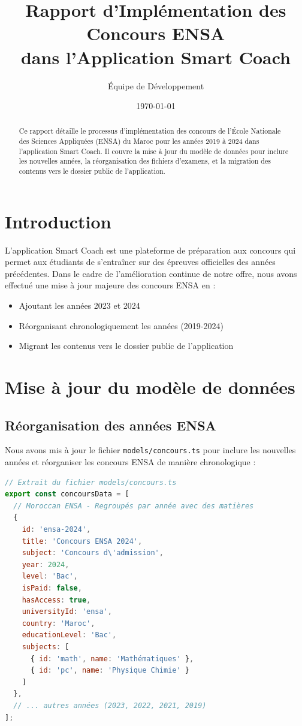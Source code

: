 \documentclass[12pt,a4paper]{article}
\title{\vspace{-1.5cm}\textbf{Rapport d'Implémentation des Concours ENSA\\dans l'Application Smart Coach}}
\author{Équipe de Développement}
\date{\today}
\begin{document}
\maketitle

\begin{abstract}
    Ce rapport détaille le processus d'implémentation des concours de l'École Nationale des Sciences Appliquées (ENSA) du Maroc pour les années 2019 à 2024 dans l'application Smart Coach. Il couvre la mise à jour du modèle de données pour inclure les nouvelles années, la réorganisation des fichiers d'examens, et la migration des contenus vers le dossier public de l'application.
\end{abstract}

\tableofcontents

\newpage

\section{Introduction}

L'application Smart Coach est une plateforme de préparation aux concours qui permet aux étudiants de s'entraîner sur des épreuves officielles des années précédentes. Dans le cadre de l'amélioration continue de notre offre, nous avons effectué une mise à jour majeure des concours ENSA en :
\begin{itemize}
    \item Ajoutant les années 2023 et 2024
    \item Réorganisant chronologiquement les années (2019-2024)
    \item Migrant les contenus vers le dossier public de l'application
\end{itemize}

\section{Mise à jour du modèle de données}

\subsection{Réorganisation des années ENSA}

Nous avons mis à jour le fichier \texttt{models/concours.ts} pour inclure les nouvelles années et réorganiser les concours ENSA de manière chronologique :

\begin{lstlisting}[language=JavaScript, caption=Mise à jour des concours ENSA]
// Extrait du fichier models/concours.ts
export const concoursData = [
  // Moroccan ENSA - Regroupés par année avec des matières
  {
    id: 'ensa-2024',
    title: 'Concours ENSA 2024',
    subject: 'Concours d\'admission',
    year: 2024,
    level: 'Bac',
    isPaid: false,
    hasAccess: true,
    universityId: 'ensa',
    country: 'Maroc',
    educationLevel: 'Bac',
    subjects: [
      { id: 'math', name: 'Mathématiques' },
      { id: 'pc', name: 'Physique Chimie' }
    ]
  },
  // ... autres années (2023, 2022, 2021, 2019)
];
\end{lstlisting}
\end{document}
